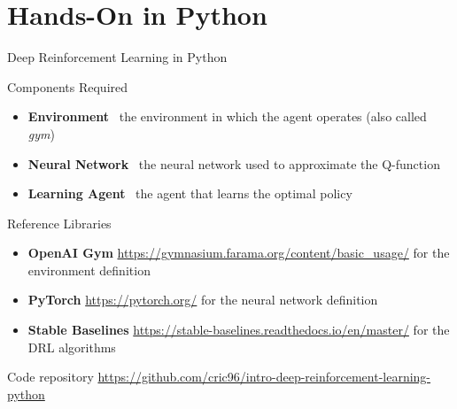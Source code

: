 \documentclass[presentation, 9pt]{beamer}\mode<presentation>{\usetheme{AMSBolognaFC}}
\begin{document}
\section{Hands-On in Python}
\begin{frame}{Deep Reinforcement Learning in Python}
\begin{block}{Components Required}
	\begin{itemize}
		\item \textbf{Environment} \faArrowRight \, the environment in which the agent operates (also called \textit{gym})
		\item \textbf{Neural Network} \faArrowRight \, the neural network used to approximate the Q-function
		\item \textbf{Learning Agent} \faArrowRight \, the agent that learns the optimal policy
	\end{itemize}
\end{block}
\begin{block}{Reference Libraries}
	\begin{itemize}
		\item \textbf{OpenAI Gym} \url{https://gymnasium.farama.org/content/basic_usage/} \faArrowRight for the environment definition
		\item \textbf{PyTorch} \url{https://pytorch.org/} \faArrowRight for the neural network definition
		\item \textbf{Stable Baselines}  \url{https://stable-baselines.readthedocs.io/en/master/} \faArrowRight for the DRL algorithms
	\end{itemize}
\end{block}
\begin{exampleblock}{Code repository}
\url{https://github.com/cric96/intro-deep-reinforcement-learning-python}
\end{exampleblock}
\end{frame}
\end{document}
